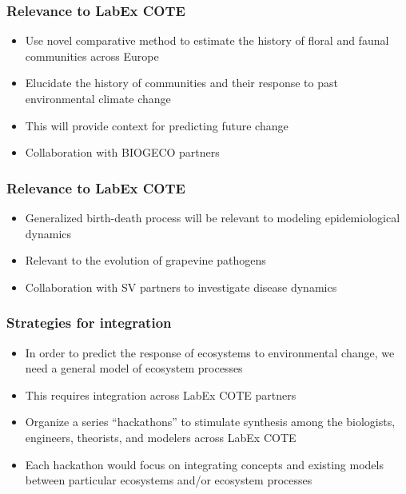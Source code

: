 \begin{frame}
    \frametitle{Relevance to LabEx COTE}
    \begin{itemize}
        \item<2-> Use novel comparative method to estimate the history of floral
            and faunal communities across Europe
        \item<3-> Elucidate the history of communities and their response to past
            environmental climate change
        \item<4-> This will provide context for predicting future change
        \item<5-> Collaboration with BIOGECO partners
    \end{itemize}
\end{frame}

\begin{frame}
    \frametitle{Relevance to LabEx COTE}
    \begin{itemize}[<+->]
        \item Generalized birth-death process will be relevant to
            modeling epidemiological dynamics
        \item Relevant to the evolution of grapevine pathogens
        \item Collaboration with SV partners to investigate disease dynamics
    \end{itemize}
\end{frame}


\begin{frame}
    \frametitle{Strategies for integration}
    \begin{itemize}
        \item<2-> In order to predict the response of ecosystems to environmental
            change, we need a general model of ecosystem processes
        \item<3-> This requires integration across LabEx COTE partners
        \item<3-> Organize a series ``hackathons'' to stimulate synthesis among the
            biologists, engineers, theorists, and modelers across LabEx COTE
        \item<4-> Each hackathon would focus on integrating concepts and existing
            models between particular ecosystems and/or ecosystem processes
    \end{itemize}
\end{frame}

